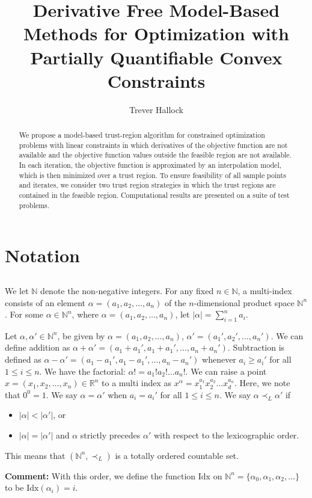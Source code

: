 \documentclass{article}
\title{Derivative Free Model-Based Methods for Optimization with Partially Quantifiable Convex Constraints}
\author{Trever Hallock}
\newenvironment{comment}
  {\par\medskip
   \color{red}%
   \begin{framed}
   \textbf{Comment: }\ignorespaces}
 {\end{framed}
  \medskip}
\theoremstyle{case}
\newcommand{\naturals}{\mathbb N}
\newcommand{\natsn}{\naturals^n}
\newcommand{\Rn}{\mathbb R^n}
\newcommand{\ltl}{{\prec_{L}}}
\newcommand{\idx}{{\textrm{Idx}}}
\begin{document}
\maketitle

\begin{abstract}

We propose a model-based trust-region algorithm for constrained optimization problems with linear constraints in which derivatives of the objective function are not available and the objective function values outside the feasible region are not available.
In each iteration, the objective function is approximated by an interpolation model, which is then minimized over a trust region.
To ensure feasibility of all sample points and iterates, we consider two trust region strategies in which the trust regions are contained in the feasible region.
Computational results are presented on a suite of test problems.

\end{abstract}

\newpage

\tableofcontents

\newpage




\section{Notation}
\large
\subsection{}
We let $\naturals$ denote the non-negative integers.
For any fixed $n \in \naturals$, a multi-index consists of an element $\alpha = (a_1, a_2, \ldots, a_n)$ of the $n$-dimensional product space $\natsn$.
For some $\alpha \in \natsn $, where $\alpha = (a_1, a_2, \ldots, a_n)$, let $|\alpha| = \sum_{i=1}^n a_i$.

Let $\alpha, \alpha' \in \natsn $, be given by $\alpha = (a_1, a_2, \ldots, a_n)$, $\alpha' = (a_1', a_2', \ldots, a_n')$.
We can define addition as
$\alpha + \alpha' = (a_1 + a_1', a_1 + a_1', \ldots, a_n + a_n')$.
Subtraction is defined as
$\alpha - \alpha' = (a_1 - a_1', a_1 - a_1', \ldots, a_n - a_n')$
whenever $a_i \ge a_i'$ for all $1 \le i \le n$.
We have the factorial:
$\alpha! = a_1!a_2!\ldots a_n!$.
We can raise a point $x = (x_1, x_2, \ldots, x_n) \in \Rn$ to a multi index as
$x^{\alpha} = x_1^{a_1}x_2^{a_2}\ldots x_d^{a_n}$.
Here, we note that $0^0 = 1$.
We say $\alpha = \alpha'$ when $a_i = a_i'$ for all $1 \le i \le n$.
We say $\alpha \ltl \alpha'$ if
\begin{itemize}
\item $|\alpha| < |\alpha'|$, or
\item $|\alpha| = |\alpha'|$ and $\alpha$ strictly precedes $\alpha'$ with respect to the lexicographic order.
\end{itemize}
This means that $\left(\natsn, \ltl\right)$ is a totally ordered countable set.
\begin{comment}
With this order, we define the function $\idx$ on $\natsn = \{\alpha_0, \alpha_1, \alpha_2, \ldots\}$ to be $\idx(\alpha_i) = i$.
\end{comment}
\end{document}
